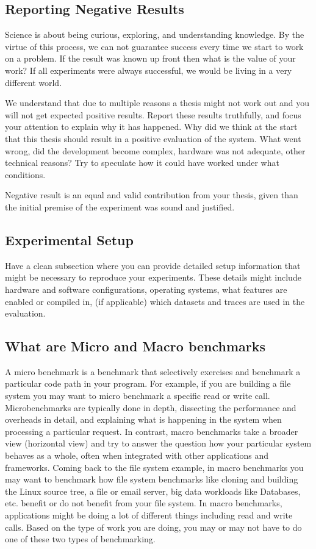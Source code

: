 \subsection{Reporting Negative Results}
Science is about being curious, exploring, and understanding knowledge. By the virtue of this process, we can not guarantee success every time we start to work on a problem. If the result was known up front then what is the value of your work? If all experiments were always successful, we would be living in a very different world. 

We understand that due to multiple reasons a thesis might not work out and you will not get expected positive results. Report these results truthfully, and focus your attention to explain why it has happened. Why did we think at the start that this thesis should result in a positive evaluation of the system. What went wrong, did the development become complex, hardware was not adequate, other technical reasons? Try to speculate how it could have worked under what conditions. 

Negative result is an equal and valid contribution from your thesis, given than the initial premise of the experiment was sound and justified. 

\subsection{Experimental Setup}
Have a clean subsection where you can provide detailed setup information that might be necessary to reproduce your experiments. These details might include hardware and software configurations, operating systems, what features are enabled or compiled in, (if applicable) which datasets and traces are used in the evaluation. 

\subsection*{What are Micro and Macro benchmarks}
A micro benchmark is a benchmark that selectively exercises and benchmark a particular code path in your program. For example, if you are building a file system you may want to micro benchmark a specific read or write call. Microbenchmarks are typically done in depth, dissecting the performance and overheads in detail, and explaining what is happening in the system when processing a particular request. In contrast, macro benchmarks take a broader view (horizontal view) and try to answer the question how your particular system behaves as a whole, often when integrated with other applications and frameworks. Coming back to the file system example, in macro benchmarks you may want to benchmark how file system benchmarks like cloning and building the Linux source tree, a file or email server, big data workloads like Databases, etc. benefit or do not benefit from your file system. In macro benchmarks, applications might be doing a lot of different things including read and write calls. Based on the type of work you are doing, you may or may not have to do one of these two types of benchmarking. 

